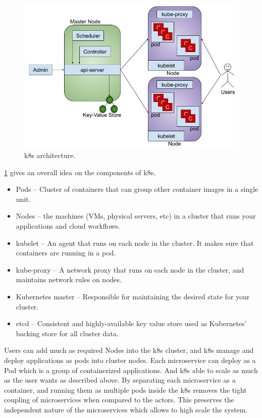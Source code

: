 \begin{figure}[htp]
    \centering
    \includegraphics[width=1\textwidth]{method/microservice/k8s_architecture_v3.jpg}
    \caption{\acrfull{k8s} architecture.}
    \label{fi:k8s_architecture}
\end{figure}
\cref{fi:k8s_architecture} gives an overall idea on the components of \acrshort{k8s},
\begin{itemize}
    \item Pods -- Cluster of containers that can group other container images in a single unit.
    \item Nodes -- the machines (VMs, physical servers, etc) in a cluster that runs your applications and cloud workflows.
    \item kubelet -- An agent that runs on each node in the cluster. It makes sure that containers are running in a pod.
    \item kube-proxy -- A network proxy that runs on each node in the cluster, and maintains network rules on nodes.
    \item Kubernetes master -- Responsible for maintaining the desired state for your cluster.
    \item etcd -- Consistent and highly-available key value store used as Kubernetes’ backing store for all cluster data.
\end{itemize}

Users can add much as required Nodes into the \acrshort{k8s} cluster, and \acrshort{k8s} manage and deploy applications as pods into cluster nodes.
Each microservice can deploy as a Pod which is a group of containerized applications. And \acrshort{k8s} able to scale as much as the user wants as described above.
By separating each microservice as a container, and running them as multiple pods inside the \acrshort{k8s} removes the tight coupling of microservices when compared to the actors. This preserves the independent nature of the microservices which allows to high scale the system.

